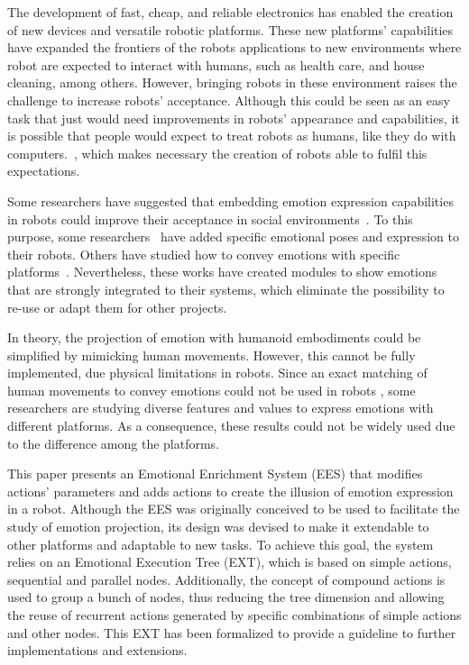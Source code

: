 The development of fast, cheap, and reliable electronics has enabled the creation of new devices and versatile robotic platforms. These new platforms' capabilities have expanded the frontiers of the robots applications to new environments where robot are expected to interact with humans, such as health care, and house cleaning, among others. However, bringing robots in these environment raises the challenge to increase robots' acceptance. Although this could be seen as an easy task that just would need improvements in robots' appearance and capabilities, it is possible that people would expect to treat robots as humans, like they do with computers.~\cite{Reeves1996}, which makes necessary the creation of robots able to fulfil this expectations.

Some researchers have suggested that embedding emotion expression capabilities in robots could improve their acceptance in social environments~\cite{Pavia2014}. To this purpose, some researchers~\cite{Breazeal2002, Arras2012} have added specific emotional poses and expression to their robots. Others have studied how to convey emotions with specific platforms~\cite{Li2011, Brown2014}. Nevertheless, these works have created modules to show emotions that are strongly integrated to their systems, which eliminate the possibility to re-use or adapt them for other projects.

In theory, the projection of emotion with humanoid embodiments could be simplified by mimicking human movements. However, this cannot be fully implemented, due physical limitations in robots. Since an exact matching of human movements to convey emotions could not be used in robots \cite{Saerbeck2007,Canamero2010}, some researchers are studying diverse features and values to express emotions with different platforms. As a consequence, these results could not be widely used due to the difference among the platforms.

This paper presents an Emotional Enrichment System (EES) that modifies actions' parameters and adds actions to create the illusion of emotion expression in a robot. Although the EES was originally conceived to be used to facilitate the study of emotion projection, its design was devised to make it extendable to other platforms and adaptable to new tasks. To achieve this goal, the system relies on an Emotional Execution Tree (EXT), which is based on simple actions, sequential and parallel nodes. Additionally, the concept of compound actions is used to group a bunch of nodes, thus reducing the tree dimension and allowing the reuse of recurrent actions generated by specific combinations of simple actions and other nodes. This EXT has been formalized to provide a guideline to further implementations and extensions.
 
